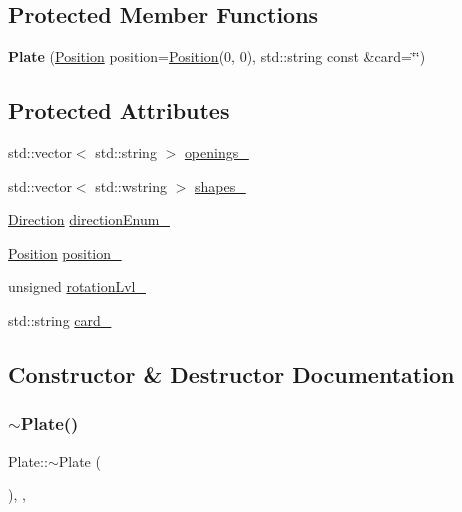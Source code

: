 \subsection*{Protected Member Functions}
\begin{DoxyCompactItemize}
\item 
\mbox{\label{class_plate_a800a12879e2044dcde01e0be9060866d}} 
{\bfseries Plate} (\mbox{\hyperlink{class_position}{Position}} position=\mbox{\hyperlink{class_position}{Position}}(0, 0), std\+::string const \&card=\char`\"{}\char`\"{})
\end{DoxyCompactItemize}
\subsection*{Protected Attributes}
\begin{DoxyCompactItemize}
\item 
std\+::vector$<$ std\+::string $>$ \mbox{\hyperlink{class_plate_a792f5bca5912b7eca3bc0a516cc87f75}{openings\+\_\+}}
\item 
std\+::vector$<$ std\+::wstring $>$ \mbox{\hyperlink{class_plate_a6c1abc6a89b53eb901f19c2aaaf0320a}{shapes\+\_\+}}
\item 
\mbox{\hyperlink{class_direction}{Direction}} \mbox{\hyperlink{class_plate_abd3b1c8174eb9b7ddfcc4b65d0f58359}{direction\+Enum\+\_\+}}
\item 
\mbox{\hyperlink{class_position}{Position}} \mbox{\hyperlink{class_plate_a0b1a00268147cb0285595d28ff4141a4}{position\+\_\+}}
\item 
unsigned \mbox{\hyperlink{class_plate_a02ccbda576b947364d5ae62b8ec15b61}{rotation\+Lvl\+\_\+}}
\item 
std\+::string \mbox{\hyperlink{class_plate_a9ee1e8fbce0414bd861cef599e98705e}{card\+\_\+}}
\end{DoxyCompactItemize}


\subsection{Constructor \& Destructor Documentation}
\mbox{\label{class_plate_a07e82e84811b82030f8497f340b6b92e}} 
\subsubsection{\texorpdfstring{$\sim$Plate()}{~Plate()}}
{\footnotesize\ttfamily Plate\+::$\sim$\+Plate (\begin{DoxyParamCaption}{ }\end{DoxyParamCaption})\hspace{0.3cm}{\ttfamily [inline]}, {}, {\ttfamily [default]}}

